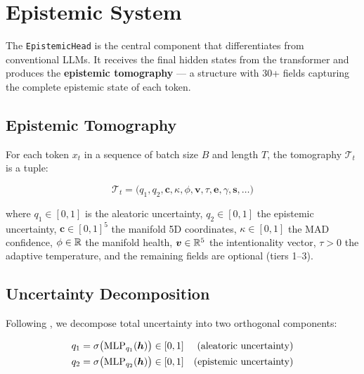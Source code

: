 
\section{Epistemic System}
\label{sec:epistemic}

The \texttt{EpistemicHead} is the central component that differentiates
\aletheion{} from conventional LLMs. It receives the final hidden states
from the transformer and produces the \textbf{epistemic tomography} ---
a structure with 30+ fields capturing the complete epistemic state of
each token.

\subsection{Epistemic Tomography}

\begin{definition}
\label{def:tomography}
For each token $x_t$ in a sequence of batch size $B$ and length $T$,
the tomography $\mathcal{T}_t$ is a tuple:

\begin{equation}
    \mathcal{T}_t = \big(q_1, q_2, \bm{c}, \kappa, \phi, \bm{v}, \tau, \bm{e}, \gamma, \bm{s}, \ldots\big)
\end{equation}

where $q_1 \in [0,1]$ is the aleatoric uncertainty, $q_2 \in [0,1]$ the
epistemic uncertainty, $\bm{c} \in [0,1]^5$ the manifold 5D coordinates,
$\kappa \in [0,1]$ the MAD confidence, $\phi \in \mathbb{R}$ the manifold health,
$\bm{v} \in \mathbb{R}^5$ the intentionality vector, $\tau > 0$ the adaptive
temperature, and the remaining fields are optional (tiers 1--3).
\end{definition}

\subsection{Uncertainty Decomposition}

Following \cite{der2009aleatory}, we decompose total uncertainty into two
orthogonal components:

\begin{align}
    q_1 &= \sigma\big(\text{MLP}_{q_1}(\bm{h})\big) \in [0, 1] & \text{(aleatoric uncertainty)} \\
    q_2 &= \sigma\big(\text{MLP}_{q_2}(\bm{h})\big) \in [0, 1] & \text{(epistemic uncertainty)}
\end{align}

